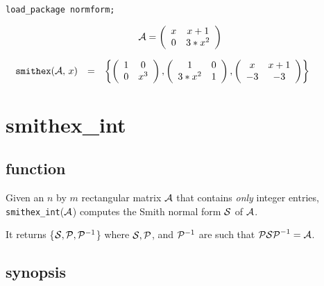 {\tt load\_package normform;}

\begin{displaymath}
{\cal A} = \left( \begin{array}{cc} x & x+1 \\ 0 & 3*x^2 \end{array}
\right)
\end{displaymath}

\begin{displaymath}
\hspace{-0.5in}
\begin{array}{ccc}
{\tt smithex}({\cal A},\, x) & = &
\left\{ \left( \begin{array}{cc} 1 & 0 \\
0 & x^3 \end{array} \right), \left( \begin{array}{cc} 1 & 0 \\ 3*x^2
& 1 \end{array} \right), \left( \begin{array}{cc} x & x+1 \\ -3 & -3
\end{array} \right) \right\} \end{array}
\end{displaymath}


\section{smithex\_int}

\subsection{function}

Given an $n$ by $m$ rectangular matrix ${\cal A}$ that contains
{\it only} integer entries, {\tt smithex\_int}(${\cal A}$) computes the
Smith normal form ${\cal S}$ of ${\cal A}$.

It returns \{${\cal S}, {\cal P}, {\cal P}^{-1}$\} where ${\cal S},
{\cal P}$, and ${\cal P}^{-1}$ are such that ${\cal P S P}^{-1} =
{\cal A}$.


\subsection{synopsis}

